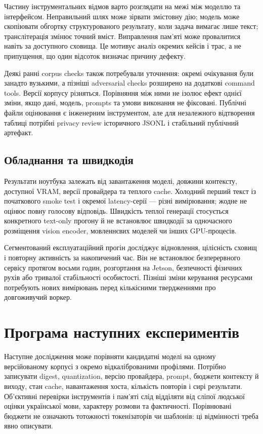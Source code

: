 \documentclass[11pt]{article}
\begin{document}
Частину інструментальних відмов варто розглядати на межі між моделлю та інтерфейсом. Неправильний шлях може зірвати змістовну дію; модель може скопіювати обгортку структурованого результату, коли задача вимагає лише текст; транслітерація змінює точний вміст. Виправлення пам'яті може провалитися навіть за доступного сховища. Це мотивує аналіз окремих кейсів і трас, а не припущення, що один відсоток визначає причину дефекту.

Деякі ранні corpus checks також потребували уточнення: окремі очікування були занадто вузькими, а пізніші adversarial checks розширено на додаткові command tools. Версії корпусу різняться. Порівняння між ними не ізолює ефект однієї зміни, якщо дані, модель, prompts та умови виконання не фіксовані. Публічні файли оцінювання є інженерним інструментом, але для незалежного відтворення таблиці потрібні privacy review історичного JSONL і стабільний публічний артефакт.

\subsection{Обладнання та швидкодія}
Результати ноутбука залежать від завантаження моделі, довжини контексту, доступної VRAM, версії провайдера та теплого cache. Холодний перший текст із початкового smoke test і окремої latency-серії --- різні вимірювання; жодне не оцінює повну голосову відповідь. Швидкість теплої генерації стосується конкретного text-only прогону й не встановлює швидкодії за одночасного розміщення vision encoder, мовленнєвих моделей чи інших GPU-процесів.

Сегментований експлуатаційний прогін досліджує відновлення, цілісність сховищ і повторну активність за накопичений час. Він не встановлює безперервного сервісу протягом восьми годин, розгортання на Jetson, безпечності фізичних рухів або тривалої стабільності особистості. Пізніші зміни керування ресурсами потребують нових вимірювань перед кількісними твердженнями про довгоживучий воркер.

\section{Програма наступних експериментів}
Наступне дослідження може порівняти кандидатні моделі на одному версійованому корпусі з окремо відкаліброваними профілями. Потрібно записувати digest, quantization, версію провайдера, prompt, бюджети контексту й виходу, стан cache, навантаження хоста, кількість повторів і сирі результати. Об'єктивні перевірки інструментів і пам'яті слід відділяти від сліпої людської оцінки української мови, характеру розмови та фактичності. Порівнювані бюджети не означають тотожності токенізаторів чи шаблонів: ці відмінності треба явно описувати.
\end{document}
